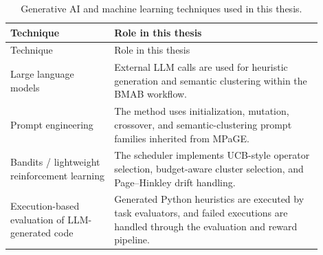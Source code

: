 \begin{longtable}{
  >{\raggedright\arraybackslash}p{0.30\linewidth}
  >{\raggedright\arraybackslash}p{0.60\linewidth}
}
\caption{Generative AI and machine learning techniques used in this thesis.}
\label{tab:technique-inventory}\\
\toprule
Technique & Role in this thesis \\
\midrule
\endfirsthead
\toprule
Technique & Role in this thesis \\
\midrule
\endhead
Large language models & External LLM calls are used for heuristic generation and semantic clustering within the BMAB workflow. \\
Prompt engineering & The method uses initialization, mutation, crossover, and semantic-clustering prompt families inherited from MPaGE. \\
Bandits / lightweight reinforcement learning & The scheduler implements UCB-style operator selection, budget-aware cluster selection, and Page--Hinkley drift handling. \\
Execution-based evaluation of LLM-generated code & Generated Python heuristics are executed by task evaluators, and failed executions are handled through the evaluation and reward pipeline. \\
\bottomrule
\end{longtable}
